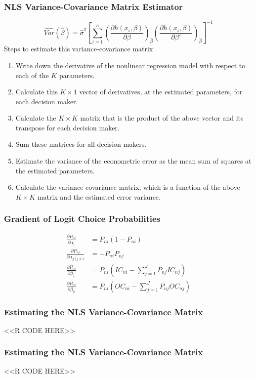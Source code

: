 \documentclass{beamer}
\begin{document}
\begin{frame}\frametitle{NLS Variance-Covariance Matrix Estimator}
    $$\widehat{Var}(\hat{\beta}) = \hat{\sigma}^2 \left[ \sum_{i = 1}^n \left( \frac{\partial h(x_i, \beta)}{\partial \beta} \right)_{\hat{\beta}} \left( \frac{\partial h(x_i, \beta)}{\partial \beta'} \right)_{\hat{\beta}} \right]^{-1}$$
    Steps to estimate this variance-covariance matrix
    \begin{enumerate}
        \item Write down the derivative of the nonlinear regression model with respect to each of the $K$ parameters.
        \item Calculate this $K \times 1$ vector of derivatives, at the estimated parameters, for each decision maker.
        \item Calculate the $K \times K$ matrix that is the product of the above vector and its transpose for each decision maker.
        \item Sum these matrices for all decision makers.
        \item Estimate the variance of the econometric error as the mean sum of squares at the estimated parameters.
        \item Calculate the variance-covariance matrix, which is a function of the above $K \times K$ matrix and the estimated error variance.
    \end{enumerate}
\end{frame}

\begin{frame}\frametitle{Gradient of Logit Choice Probabilities}
    \begin{align*}
        \frac{\partial P_{ni}}{\partial \alpha_i} &= P_{ni} (1 - P_{ni}) \\
        \frac{\partial P_{ni}}{\partial \alpha_{j \mid j \neq i}} &= -P_{ni} P_{nj} \\
        \frac{\partial P_{ni}}{\partial \beta_1} &= P_{ni} (IC_{ni} - \sum_{j= 1}^J P_{nj} IC_{nj}) \\
        \frac{\partial P_{ni}}{\partial \beta_2} &= P_{ni} (OC_{ni} - \sum_{j= 1}^J P_{nj} OC_{nj})
    \end{align*}
\end{frame}

\begin{frame}[fragile]\frametitle{Estimating the NLS Variance-Covariance Matrix}
    <<R CODE HERE>>
\end{frame}

\begin{frame}[fragile]\frametitle{Estimating the NLS Variance-Covariance Matrix}
    <<R CODE HERE>>
\end{frame}
\end{document}
